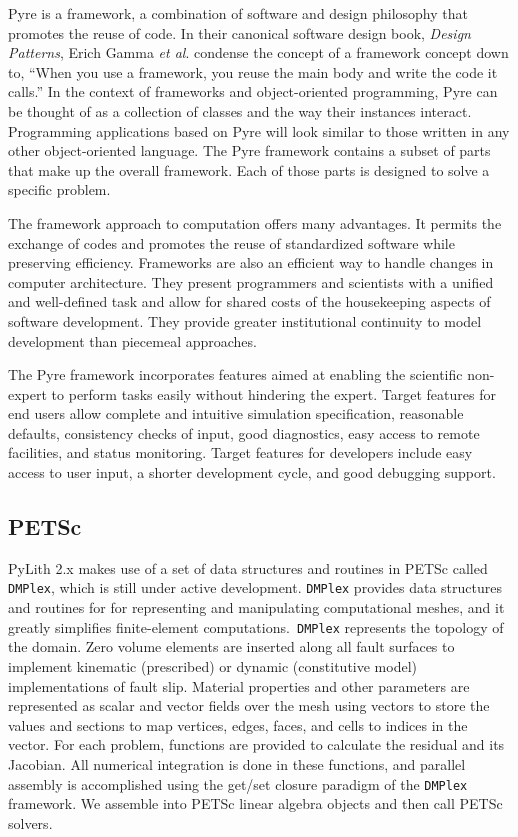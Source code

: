 Pyre is a framework, a combination of software and design philosophy
that promotes the reuse of code. In their canonical software design
book, \emph{Design Patterns}, Erich Gamma \textit{et al}. condense
the concept of a framework concept down to, ``When you use a framework,
you reuse the main body and write the code it calls.'' In the context
of frameworks and object-oriented programming, Pyre can be thought
of as a collection of classes and the way their instances interact.
Programming applications based on Pyre will look similar to those
written in any other object-oriented language. The Pyre framework
contains a subset of parts that make up the overall framework. Each
of those parts is designed to solve a specific problem.

The framework approach to computation offers many advantages. It permits
the exchange of codes and promotes the reuse of standardized software
while preserving efficiency. Frameworks are also an efficient way
to handle changes in computer architecture. They present programmers
and scientists with a unified and well-defined task and allow for
shared costs of the housekeeping aspects of software development.
They provide greater institutional continuity to model development
than piecemeal approaches.

The Pyre framework incorporates features aimed at enabling the scientific
non-expert to perform tasks easily without hindering the expert. Target
features for end users allow complete and intuitive simulation specification,
reasonable defaults, consistency checks of input, good diagnostics,
easy access to remote facilities, and status monitoring. Target features
for developers include easy access to user input, a shorter development
cycle, and good debugging support.


\subsection{PETSc}

PyLith 2.x makes use of a set of data structures and routines in PETSc
called \texttt{DMPlex}, which is still under active development. \texttt{DMPlex}
provides data structures and routines for for representing and manipulating
computational meshes, and it greatly simplifies finite-element computations.\texttt{ DMPlex}
represents the topology of the domain. Zero volume elements are inserted
along all fault surfaces to implement kinematic (prescribed) or dynamic
(constitutive model) implementations of fault slip. Material properties
and other parameters are represented as scalar and vector fields over
the mesh using vectors to store the values and sections to map vertices,
edges, faces, and cells to indices in the vector. For each problem,
functions are provided to calculate the residual and its Jacobian.
All numerical integration is done in these functions, and parallel
assembly is accomplished using the get/set closure paradigm of the
\texttt{DMPlex} framework. We assemble into PETSc linear algebra objects
and then call PETSc solvers.

